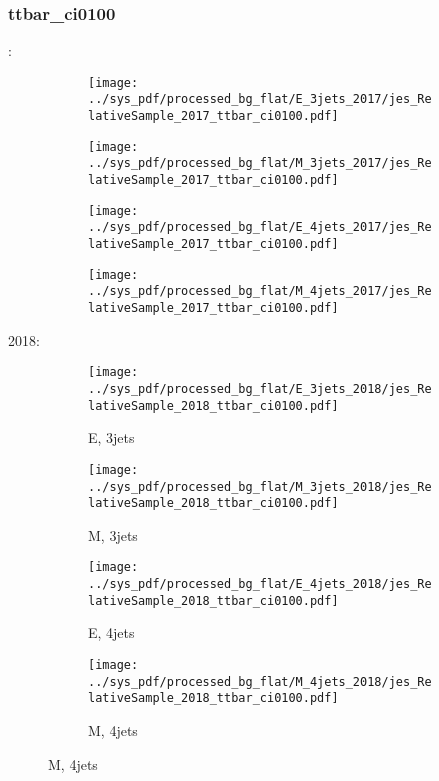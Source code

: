 \documentclass{beamer}
\begin{document}
\begin{frame}
\frametitle{ttbar_ci0100}
\fontsize{5}{1}:
\begin{figure}
\centering
\begin{subfigure}[b]{0.24\textwidth}
\texttt{[image: ../sys\_pdf/processed\_bg\_flat/E\_3jets\_2017/jes\_RelativeSample\_2017\_ttbar\_ci0100.pdf]}
\end{subfigure}
\begin{subfigure}[b]{0.24\textwidth}
\texttt{[image: ../sys\_pdf/processed\_bg\_flat/M\_3jets\_2017/jes\_RelativeSample\_2017\_ttbar\_ci0100.pdf]}
\end{subfigure}
\begin{subfigure}[b]{0.24\textwidth}
\texttt{[image: ../sys\_pdf/processed\_bg\_flat/E\_4jets\_2017/jes\_RelativeSample\_2017\_ttbar\_ci0100.pdf]}
\end{subfigure}
\begin{subfigure}[b]{0.24\textwidth}
\texttt{[image: ../sys\_pdf/processed\_bg\_flat/M\_4jets\_2017/jes\_RelativeSample\_2017\_ttbar\_ci0100.pdf]}
\end{subfigure}
\end{figure}
2018:
\begin{figure}
\centering
\begin{subfigure}[b]{0.24\textwidth}
\texttt{[image: ../sys\_pdf/processed\_bg\_flat/E\_3jets\_2018/jes\_RelativeSample\_2018\_ttbar\_ci0100.pdf]}
\captionsetup{font=tiny}
\caption{E, 3jets}
\end{subfigure}
\begin{subfigure}[b]{0.24\textwidth}
\texttt{[image: ../sys\_pdf/processed\_bg\_flat/M\_3jets\_2018/jes\_RelativeSample\_2018\_ttbar\_ci0100.pdf]}
\captionsetup{font=tiny}
\caption{M, 3jets}
\end{subfigure}
\begin{subfigure}[b]{0.24\textwidth}
\texttt{[image: ../sys\_pdf/processed\_bg\_flat/E\_4jets\_2018/jes\_RelativeSample\_2018\_ttbar\_ci0100.pdf]}
\captionsetup{font=tiny}
\caption{E, 4jets}
\end{subfigure}
\begin{subfigure}[b]{0.24\textwidth}
\texttt{[image: ../sys\_pdf/processed\_bg\_flat/M\_4jets\_2018/jes\_RelativeSample\_2018\_ttbar\_ci0100.pdf]}
\captionsetup{font=tiny}
\caption{M, 4jets}
\end{subfigure}
\end{figure}
\end{frame}
\end{document}
